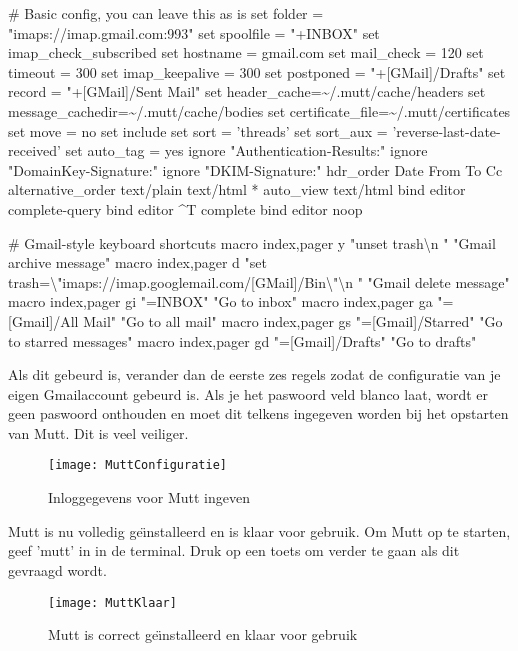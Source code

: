 \documentclass[12pt]{article}
\begin{document}
\# Basic config, you can leave this as is
set folder = "imaps://imap.gmail.com:993"
set spoolfile = "+INBOX"
set imap\_check\_subscribed
set hostname = gmail.com
set mail\_check = 120
set timeout = 300
set imap\_keepalive = 300
set postponed = "+[GMail]/Drafts"
set record = "+[GMail]/Sent Mail"
set header\_cache=\textasciitilde{}/.mutt/cache/headers
set message\_cachedir=\textasciitilde{}/.mutt/cache/bodies
set certificate\_file=\textasciitilde{}/.mutt/certificates
set move = no
set include
set sort = 'threads'
set sort\_aux = 'reverse-last-date-received'
set auto\_tag = yes
ignore "Authentication-Results:"
ignore "DomainKey-Signature:"
ignore "DKIM-Signature:"
hdr\_order Date From To Cc
alternative\_order text/plain text/html *
auto\_view text/html
bind editor  complete-query
bind editor \^{}T complete
bind editor  noop 


\# Gmail-style keyboard shortcuts
macro index,pager y "unset trash\textbackslash{}n " "Gmail archive message"
macro index,pager d "set trash=\textbackslash{}"imaps://imap.googlemail.com/[GMail]/Bin\textbackslash{}"\textbackslash{}n " "Gmail delete message"
macro index,pager gi "=INBOX" "Go to inbox"
macro index,pager ga "=[Gmail]/All Mail" "Go to all mail"
macro index,pager gs "=[Gmail]/Starred" "Go to starred messages"
macro index,pager gd "=[Gmail]/Drafts" "Go to drafts"

\vspace{10mm}

Als dit gebeurd is, verander dan de eerste zes regels zodat de configuratie van je eigen Gmailaccount gebeurd is. Als je het paswoord veld blanco laat, wordt er geen paswoord onthouden en moet dit telkens ingegeven worden bij het opstarten van Mutt. Dit is veel veiliger.

\begin{figure} [h]
\begin{center}
	\texttt{[image: MuttConfiguratie]}
\end{center}
	\caption{Inloggegevens voor Mutt ingeven}
\end{figure}

Mutt is nu volledig ge\"{\i}nstalleerd en is klaar voor gebruik. Om Mutt op te starten, geef 'mutt' in in de terminal. Druk op een toets om verder te gaan als dit gevraagd wordt.

\begin{figure} [!ht]
\begin{center}
	\texttt{[image: MuttKlaar]}
\end{center}
	\caption{Mutt is correct ge\"{\i}nstalleerd en klaar voor gebruik}
\end{figure}
\newpage
\end{document}
